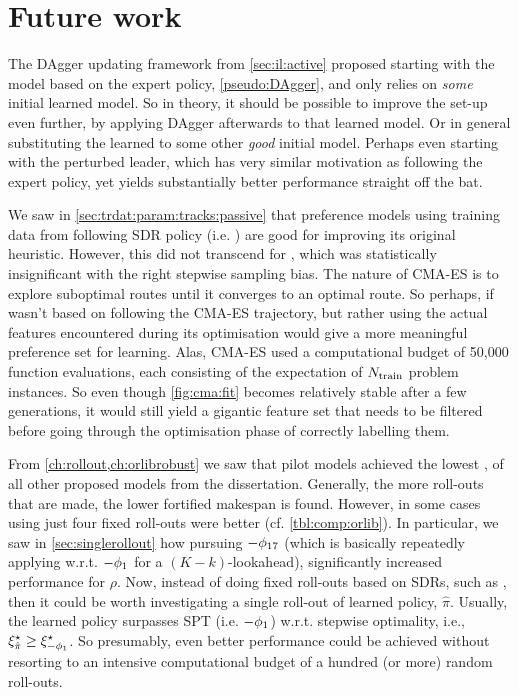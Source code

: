 \section{Future work}

The DAgger updating framework from \cref{sec:il:active} proposed starting with 
the model based on the expert policy, \cref{pseudo:DAgger}, and only relies on 
\emph{some} initial learned model. So in theory, it should be possible to 
improve the  set-up even further, by applying DAgger 
afterwards to that learned model. Or in general substituting the learned 
 to some other \emph{good} initial model.
Perhaps even starting with the perturbed leader, which has very similar 
motivation as following the expert policy, yet yields substantially better 
performance straight off the bat.

We saw in \cref{sec:trdat:param:tracks:passive} that preference models using 
training data from following SDR policy (i.e. \PhiSet{\SDR}) are good for 
improving its original heuristic. However, this did not transcend for 
\PhiSet{\CMAES}, which was statistically insignificant with the right stepwise 
sampling bias.
The nature of CMA-ES is to explore suboptimal routes until it converges to an 
optimal route. So perhaps, if \PhiSet{\CMAES} wasn't based on following the 
CMA-ES trajectory, but rather using the actual features encountered during its 
optimisation would give a more meaningful preference set for learning. 
Alas, CMA-ES used a computational budget of 50,000 function evaluations, each 
consisting of the expectation of $N_{\text{train}}$ problem instances. 
So even though \cref{fig:cma:fit} becomes relatively stable after a few 
generations, it would still yield a gigantic feature set that needs to be 
filtered before going through the optimisation phase of correctly labelling 
them.

From \cref{ch:rollout,ch:orlibrobust} we saw that pilot models achieved the 
lowest \namerho, of all other proposed models from the dissertation. 
Generally, the more roll-outs that are made, the lower fortified makespan is 
found. However, in some cases using just four fixed roll-outs were better (cf. 
\cref{tbl:comp:orlib}). 
In particular, we saw in \cref{sec:singlerollout} how pursuing $-\phi_{17}$ 
(which is basically repeatedly applying w.r.t. $-\phi_1$ for a 
$(K-k)$-lookahead), significantly increased performance for $\rho$.
Now, instead of doing fixed roll-outs based on SDRs, such as \phiSDRRelated, 
then it could be worth investigating a single roll-out of learned policy, 
$\hat{\pi}$. 
Usually, the learned policy surpasses SPT (i.e. $-\phi_1$) w.r.t. stepwise 
optimality, i.e., $\xi^{\star}_{\hat{\pi}}\geq\xi^{\star}_{-\phi_1}$. 
So presumably, even better performance could be achieved without resorting 
to an intensive computational budget of a hundred (or more) random roll-outs.

